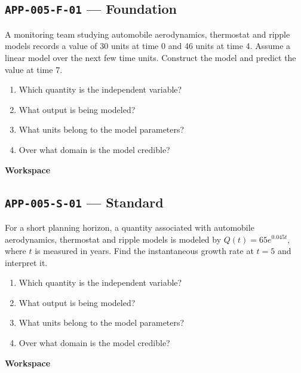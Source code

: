 \documentclass[11pt]{book}
\newcommand{\pid}[1]{\texttt{#1}}
\newcommand{\workspace}{\par\vspace{0.7in}\hrulefill\par\vspace{0.55in}\hrulefill\par}
\begin{document}
\subsection*{\pid{APP-005-F-01} — Foundation}
\begin{problembox}
A monitoring team studying automobile aerodynamics, thermostat and ripple models records a value of 30 units at time 0 and 46 units at time 4. Assume a linear model over the next few time units. Construct the model and predict the value at time 7.
\end{problembox}
\begin{promptbox}\begin{enumerate}
\item Which quantity is the independent variable?
\item What output is being modeled?
\item What units belong to the model parameters?
\item Over what domain is the model credible?
\end{enumerate}\end{promptbox}
\textbf{Workspace}\workspace
{}
\subsection*{\pid{APP-005-S-01} — Standard}
\begin{problembox}
For a short planning horizon, a quantity associated with automobile aerodynamics, thermostat and ripple models is modeled by $Q(t)=65e^{0.045t}$, where $t$ is measured in years. Find the instantaneous growth rate at $t=5$ and interpret it.
\end{problembox}
\begin{promptbox}\begin{enumerate}
\item Which quantity is the independent variable?
\item What output is being modeled?
\item What units belong to the model parameters?
\item Over what domain is the model credible?
\end{enumerate}\end{promptbox}
\textbf{Workspace}\workspace
{}
\end{document}
